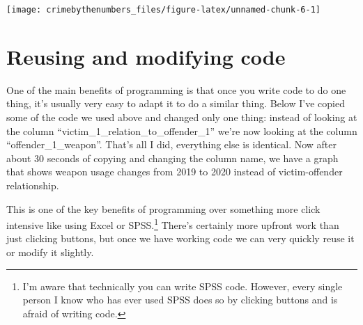 \documentclass[
]{krantz}
\makeatletter
\newenvironment{Shaded}{\begin{snugshade}}{\end{snugshade}}
\newcommand{\AttributeTok}[1]{\textcolor[rgb]{0.61,0.61,0.61}{#1}}
\newcommand{\FunctionTok}[1]{\textcolor[rgb]{0,0,0}{#1}}
\newcommand{\NormalTok}[1]{#1}
\newcommand{\OtherTok}[1]{\textcolor[rgb]{0.37,0.37,0.37}{#1}}
\newcommand{\SpecialCharTok}[1]{\textcolor[rgb]{0,0,0}{#1}}
\newcommand{\StringTok}[1]{\textcolor[rgb]{0.5,0.5,0.5}{#1}}
\newenvironment{kframe}{%
\medskip{}
\setlength{\fboxsep}{.8em}
 \def\at@end@of@kframe{}%
 \ifinner\ifhmode%
  \def\at@end@of@kframe{\end{minipage}}%
  \begin{minipage}{\columnwidth}%
 \fi\fi%
 \def\FrameCommand##1{\hskip\@totalleftmargin \hskip-\fboxsep
 \colorbox{shadecolor}{##1}\hskip-\fboxsep
     \hskip-\linewidth \hskip-\@totalleftmargin \hskip\columnwidth}%
 \MakeFramed {\advance\hsize-\width
   \@totalleftmargin\z@ \linewidth\hsize
   \@setminipage}}%
 {\par\unskip\endMakeFramed%
 \at@end@of@kframe}
\renewenvironment{Shaded}{\begin{kframe}}{\end{kframe}}
\makeatother
\begin{document}
\begin{Shaded}
\end{Shaded}

\begin{center}\texttt{[image: crimebythenumbers\_files/figure-latex/unnamed-chunk-6-1]} \end{center}

\hypertarget{reusing-and-modifying-code}{%
\section{Reusing and modifying code}\label{reusing-and-modifying-code}}

One of the main benefits of programming is that once you write code to do one thing, it's usually very easy to adapt it to do a similar thing. Below I've copied some of the code we used above and changed only one thing: instead of looking at the column ``victim\_1\_relation\_to\_offender\_1'' we're now looking at the column ``offender\_1\_weapon''. That's all I did, everything else is identical. Now after about 30 seconds of copying and changing the column name, we have a graph that shows weapon usage changes from 2019 to 2020 instead of victim-offender relationship.

This is one of the key benefits of programming over something more click intensive like using Excel or SPSS.\footnote{I'm aware that technically you can write SPSS code. However, every single person I know who has ever used SPSS does so by clicking buttons and is afraid of writing code.} There's certainly more upfront work than just clicking buttons, but once we have working code we can very quickly reuse it or modify it slightly.
\end{document}
